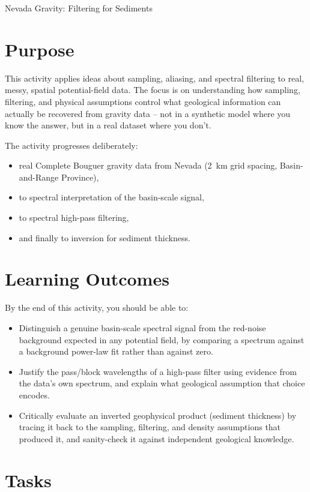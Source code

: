 \begin{activity}{Nevada Gravity: Filtering for Sediments}

\section*{Purpose}

This activity applies ideas about sampling, aliasing, and spectral filtering to real, messy, spatial potential-field data. The focus is on understanding how sampling, filtering, and physical assumptions control what geological information can actually be recovered from gravity data -- not in a synthetic model where you know the answer, but in a real dataset where you don't.

The activity progresses deliberately:
\begin{itemize}
  \item real Complete Bouguer gravity data from Nevada (2~km grid spacing, Basin-and-Range Province),
  \item to spectral interpretation of the basin-scale signal,
  \item to spectral high-pass filtering,
  \item and finally to inversion for sediment thickness.
\end{itemize}

\section*{Learning Outcomes}

By the end of this activity, you should be able to:
\begin{itemize}
  \item Distinguish a genuine basin-scale spectral signal from the red-noise background expected in any potential field, by comparing a spectrum against a background power-law fit rather than against zero.
  \item Justify the pass/block wavelengths of a high-pass filter using evidence from the data's own spectrum, and explain what geological assumption that choice encodes.
  \item Critically evaluate an inverted geophysical product (sediment thickness) by tracing it back to the sampling, filtering, and density assumptions that produced it, and sanity-check it against independent geological knowledge.
\end{itemize}

\section*{Tasks}


\end{activity}
